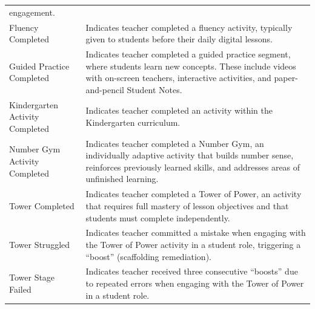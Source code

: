 \documentclass[
  number,
  preprint,
  3p,
  onecolumn]{elsarticle}
\begin{document}
\begin{longtable}[]{@{}
  >{\raggedright\arraybackslash}p{}
  >{\raggedright\arraybackslash}p{}@{}}
engagement. \\
Fluency Completed \citep{zearn2024q} & Indicates teacher completed a
fluency activity, typically given to students before their daily digital
lessons. \\
Guided Practice Completed \citep{zearn2024r} & Indicates teacher
completed a guided practice segment, where students learn new concepts.
These include videos with on-screen teachers, interactive activities,
and paper-and-pencil Student Notes. \\
Kindergarten Activity Completed \citep{zearn2024s} & Indicates teacher
completed an activity within the Kindergarten curriculum. \\
Number Gym Activity Completed \citep{zearn2024t} & Indicates teacher
completed a Number Gym, an individually adaptive activity that builds
number sense, reinforces previously learned skills, and addresses areas
of unfinished learning. \\
Tower Completed \citep{zearn2024b} & Indicates teacher completed a Tower
of Power, an activity that requires full mastery of lesson objectives
and that students must complete independently. \\
Tower Struggled \citep{zearn2024u} & Indicates teacher committed a
mistake when engaging with the Tower of Power activity in a student
role, triggering a ``boost'' (scaffolding remediation). \\
Tower Stage Failed \citep{zearn2024b} & Indicates teacher received three
consecutive ``boosts'' due to repeated errors when engaging with the
Tower of Power in a student role. \\
\end{longtable}

\newpage{}
\end{document}
